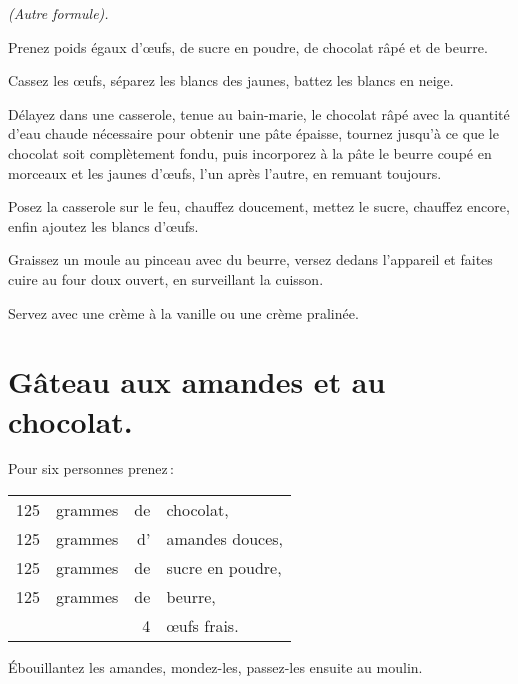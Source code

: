 \begin{center}
\textit{(Autre formule).}
\end{center}

Prenez poids égaux d'œufs, de sucre en poudre, de chocolat râpé et de beurre.

Cassez les œufs, séparez les blancs des jaunes, battez les blancs en neige.

Délayez dans une casserole, tenue au bain-marie, le chocolat râpé avec la
quantité d'eau chaude nécessaire pour obtenir une pâte épaisse, tournez jusqu'à
ce que le chocolat soit complètement fondu, puis incorporez à la pâte le beurre
coupé en morceaux et les jaunes d'œufs, l’un après l’autre, en remuant
toujours.

Posez la casserole sur le feu, chauffez doucement, mettez le sucre, chauffez
encore, enfin ajoutez les blancs d'œufs.

Graissez un moule au pinceau avec du beurre, versez dedans l'appareil et faites
cuire au four doux ouvert, en surveillant la cuisson.

Servez avec une crème à la vanille ou une crème pralinée.

\section*{\centering Gâteau aux amandes et au chocolat.}
{}

Pour six personnes prenez :

\footnotesize
\begin{longtable}{rrrp{16em}}
    125 & grammes & de & chocolat,                                                                        \\
    125 & grammes & d' & amandes douces,                                                                  \\
    125 & grammes & de & sucre en poudre,                                                                 \\
    125 & grammes & de & beurre,                                                                          \\
        &         &  4 & œufs frais.                                                                      \\
\end{longtable}
\normalsize

Ébouillantez les amandes, mondez-les, passez-les ensuite au moulin.

